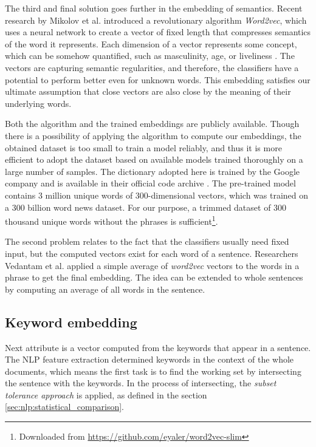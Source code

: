 \documentclass[
  digital, %
  notable,   %
  nolof,     %
  nolot,     %
]{fithesis3}
\begin{document}
The third and final solution goes further in the embedding of semantics.
Recent research by Mikolov et al. \cite{mikolov2013efficient} introduced a revolutionary algorithm \textit{Word2vec}, which uses a neural network to create a vector of fixed length that compresses semantics of the word it represents.
Each dimension of a vector represents some concept, which can be somehow quantified, such as masculinity, age, or liveliness \cite{mikolov2013linguistic}.
The vectors are capturing semantic regularities, and therefore, the classifiers have a potential to perform better even for unknown words.
This embedding satisfies our ultimate assumption that close vectors are also close by the meaning of their underlying words.

Both the algorithm and the trained embeddings are publicly available.
Though there is a possibility of applying the algorithm to compute our embeddings, the obtained dataset is too small to train a model reliably, and thus it is more efficient to adopt the dataset based on available models trained thoroughly on a large number of samples.
The dictionary adopted here is trained by the Google company and is available in their official code archive \cite{word2vecGoogle}.
The pre-trained model contains 3 million unique words of 300-dimensional vectors, which was trained on a 300 billion word news dataset.
For our purpose, a trimmed dataset of 300 thousand unique words without the phrases is sufficient\footnote{Downloaded from \url{https://github.com/eyaler/word2vec-slim}}.

The second problem relates to the fact that the classifiers usually need fixed input, but the computed vectors exist for each word of a sentence.
Researchers Vedantam et al. \cite{vedantam2015learning} applied a simple average of \textit{word2vec} vectors to the words in a phrase to get the final embedding.
The idea can be extended to whole sentences by computing an average of all words in the sentence.

\subsection{Keyword embedding}
Next attribute is a vector computed from the keywords that appear in a sentence.
The NLP feature extraction determined keywords in the context of the whole documents, which means the first task is to find the working set by intersecting the sentence with the keywords.
In the process of intersecting, the \textit{subset tolerance approach} is applied, as defined in the section \ref{sec:nlp:statistical_comparison}.
\end{document}
